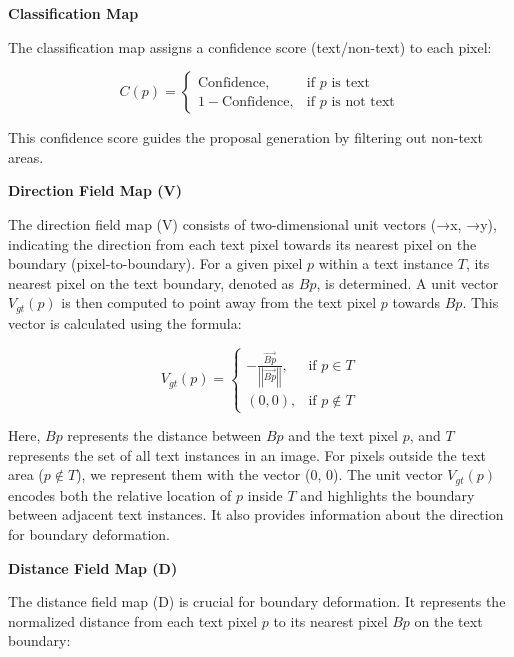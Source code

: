 \documentclass[default,iicol]{sn-jnl}%
\begin{document}
\textbf{Classification Map}

The classification map assigns a confidence score (text/non-text) to each pixel:

\begin{equation}
	C(p) =
	\begin{cases}
		\text{Confidence}, & \text{if } p \text{ is text} \\
		1 - \text{Confidence}, & \text{if } p \text{ is not text}
	\end{cases}
\end{equation}

This confidence score guides the proposal generation by filtering out non-text areas.

\textbf{Direction Field Map (V)}

The direction field map (V) consists of two-dimensional unit vectors (→x, →y), indicating the direction from each text pixel towards its nearest pixel on the boundary (pixel-to-boundary). For a given pixel \( p \) within a text instance \( T \), its nearest pixel on the text boundary, denoted as \( Bp \), is determined. A unit vector \( V_{gt}(p) \) is then computed to point away from the text pixel \( p \) towards \( Bp \). This vector is calculated using the formula:

\begin{equation}
	V_{gt}(p) =
	\begin{cases}
		-\frac{\overrightarrow{Bp}}{\left|\left|\overrightarrow{Bp}\right|\right|}, & \text{if } p \in T \\
		(0, 0), & \text{if } p \notin T
	\end{cases}
\end{equation}

Here, \( Bp \) represents the distance between \( Bp \) and the text pixel \( p \), and \( T \) represents the set of all text instances in an image. For pixels outside the text area (\( p \notin T \)), we represent them with the vector (0, 0). The unit vector \( V_{gt}(p) \) encodes both the relative location of \( p \) inside \( T \) and highlights the boundary between adjacent text instances. It also provides information about the direction for boundary deformation.

\textbf{Distance Field Map (D)}

The distance field map (D) is crucial for boundary deformation. It represents the normalized distance from each text pixel \( p \) to its nearest pixel \( Bp \) on the text boundary:
\end{document}
